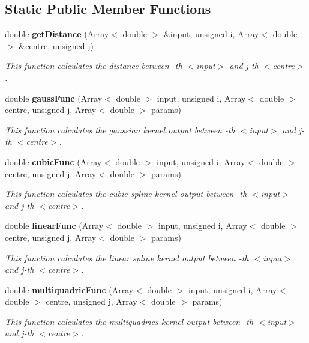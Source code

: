 \subsection*{Static Public Member Functions}
\begin{CompactItemize}
\item 
double {\bf get\-Distance} (Array$<$ double $>$ \&input, unsigned i, Array$<$ double $>$ \&centre, unsigned j)
\begin{CompactList}\small\item\em This function calculates the distance between {\em -th $<$input$>$ and j-th $<$centre$>$. \/}\item\end{CompactList}\item 
double {\bf gauss\-Func} (Array$<$ double $>$ input, unsigned i, Array$<$ double $>$ centre, unsigned j, Array$<$ double $>$ params)
\begin{CompactList}\small\item\em This function calculates the gaussian kernel output between {\em -th $<$input$>$ and j-th $<$centre$>$. \/}\item\end{CompactList}\item 
double {\bf cubic\-Func} (Array$<$ double $>$ input, unsigned i, Array$<$ double $>$ centre, unsigned j, Array$<$ double $>$ params)
\begin{CompactList}\small\item\em This function calculates the cubic spline kernel output between {\em -th $<$input$>$ and j-th $<$centre$>$. \/}\item\end{CompactList}\item 
double {\bf linear\-Func} (Array$<$ double $>$ input, unsigned i, Array$<$ double $>$ centre, unsigned j, Array$<$ double $>$ params)
\begin{CompactList}\small\item\em This function calculates the linear spline kernel output between {\em -th $<$input$>$ and j-th $<$centre$>$. \/}\item\end{CompactList}\item 
double {\bf multiquadric\-Func} (Array$<$ double $>$ input, unsigned i, Array$<$ double $>$ centre, unsigned j, Array$<$ double $>$ params)
\begin{CompactList}\small\item\em This function calculates the multiquadrics kernel output between {\em -th $<$input$>$ and j-th $<$centre$>$. \/}\item\end{CompactList}\item 

\end{CompactItemize}
